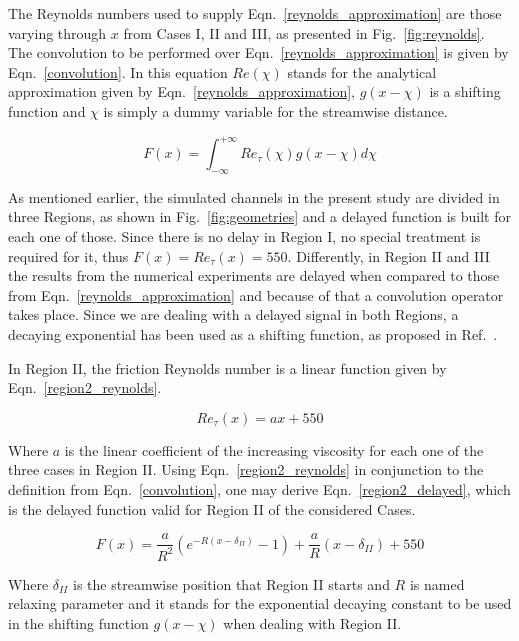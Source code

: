 \documentclass[twocolumn,10pt]{asme2e}
\begin{document}
The Reynolds numbers used to supply Eqn.~\ref{reynolds_approximation} are those varying through \(x\) from Cases I, II and III, as presented in Fig.~\ref{fig:reynolds}. The convolution to be performed over Eqn.~\ref{reynolds_approximation} is given by Eqn.~\ref{convolution}. In this equation \(Re(\chi)\) stands for the analytical approximation given by Eqn.~\ref{reynolds_approximation}, \(g(x-\chi)\)  is a shifting function and \(\chi\) is simply a dummy variable for the streamwise distance.

\begin{equation}
F(x) =  \int_{-\infty}^{+\infty} Re_{\tau}(\chi)g(x-\chi)d\chi
\label{convolution}
\end{equation}

As mentioned earlier, the simulated channels in the present study are divided in three Regions, as shown in Fig.~\ref{fig:geometries} and a delayed function is built for each one of those. Since there is no delay in Region I, no special treatment is required for it, thus \(F(x)=Re_{\tau}(x)=550\). Differently, in Region II and III the results from the numerical experiments are delayed when compared to those from Eqn.~\ref{reynolds_approximation} and because of that a convolution operator takes place. Since we are dealing with a delayed signal in both Regions, a decaying exponential has been used as a shifting function, as proposed in Ref.~\cite{signals}.

In Region II, the friction Reynolds number is a linear function given by Eqn.~\ref{region2_reynolds}.

\begin{equation}
Re_{\tau}(x)=ax+550
\label{region2_reynolds}
\end{equation}

Where \(a\) is the linear coefficient of the increasing viscosity for each one of the three cases in Region II. Using Eqn.~\ref{region2_reynolds} in conjunction to the definition from Eqn.~\ref{convolution}, one may derive Eqn.~\ref{region2_delayed}, which is the delayed function valid for Region II of the considered Cases.

\begin{equation}
F(x)= \frac{a}{R^2}(e^{-R(x-{\delta}_{II})}-1)+\frac{a}{R}(x-{\delta}_{II})+550
\label{region2_delayed}
\end{equation}

Where \({\delta}_{II}\) is the streamwise position that Region II starts and \(R\) is named relaxing parameter and it stands for the exponential decaying constant to be used in the shifting function \(g(x-\chi)\) when dealing with Region II.
\end{document}
